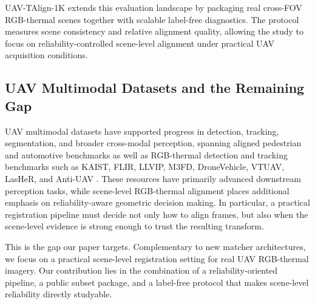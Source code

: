 UAV-TAlign-1K extends this evaluation landscape by packaging real cross-FOV RGB-thermal scenes
together with scalable label-free diagnostics. The protocol measures scene consistency and relative
alignment quality, allowing the study to focus on reliability-controlled scene-level alignment
under practical UAV acquisition conditions.

\subsection{UAV Multimodal Datasets and the Remaining Gap}

UAV multimodal datasets have supported progress in detection, tracking, segmentation, and broader
cross-modal perception, spanning aligned pedestrian and automotive benchmarks as well as
RGB-thermal detection and tracking benchmarks such as KAIST, FLIR, LLVIP, M3FD, DroneVehicle,
VTUAV, LasHeR, and Anti-UAV
\cite{hwang2015kaist,flir2018thermal,jia2021llvip,liu2022tardal,sun2022dronevehicle,zhang2022vtuav,li2022lasher,jiang2023antiuav}.
These resources have primarily advanced downstream perception tasks, while scene-level
RGB-thermal alignment places additional emphasis on reliability-aware geometric decision making.
In particular, a practical registration pipeline must decide not only how to align frames, but also
when the scene-level evidence is strong enough to trust the resulting transform.

This is the gap our paper targets. Complementary to new matcher architectures, we focus on a
practical scene-level registration setting for real UAV RGB-thermal imagery. Our contribution lies
in the combination of a reliability-oriented pipeline, a public subset package, and a label-free
protocol that makes scene-level reliability directly studyable.
